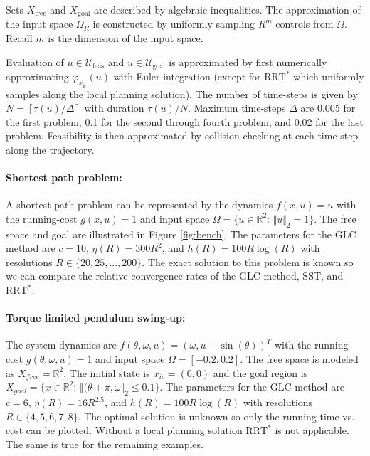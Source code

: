 \documentclass{llncs}
\newcommand{\GLC}{\ensuremath{\mathrm{GLC}}\xspace}
\newcommand{\RRTs}{\ensuremath{\mathrm{RRT}^*}\xspace}
\newcommand{\SST}{\ensuremath{\mathrm{SST}}\xspace}
\begin{document}
Sets $X_\mathrm{free}$ and $X_\mathrm{goal}$ are described by algebraic inequalities.
%
The approximation of the input space $\Omega_{R}$ is constructed by uniformly sampling $R^{m}$ controls from $\Omega$.
%
Recall $m$ is the dimension of the input space. 


Evaluation of $u\in\mathcal{U}_\mathrm{feas}$ and $u\in\mathcal{U}_\mathrm{goal}$ is approximated by first numerically approximating $\varphi_{x_\mathrm{ic}}(u)$ with Euler integration (except for \RRTs which uniformly samples along the local planning solution). 
%
The number of time-steps is given by $N=\left\lceil \tau(u)/\Delta\right\rceil $ with duration $\tau(u)/N$. Maximum time-steps $\Delta$ are 0.005 for the first problem, 0.1 for the second through fourth problem, and 0.02 for the last problem. Feasibility is then approximated by collision checking at each time-step along the trajectory.
%

\paragraph*{Shortest path problem: }

A shortest path problem can be represented by the dynamics $f(x,u)=u$ with the running-cost $g(x,u)=1$ and input space $\Omega=\{u\in\mathbb{R}^{2}:\,\Vert u\Vert_{2}=1\}.$
The free space and goal are illustrated in Figure \ref{fig:bench}.
%
The parameters for the \GLC method are $c=10$, $\eta(R)=300R^2$, and $h(R)=100R\log(R)$ with resolutions $R\in \{20,25,...,200\}$.
%
The exact solution to this problem is known so we can compare the relative convergence rates of the \GLC method, \SST, and \RRTs. 

\paragraph*{Torque limited pendulum swing-up: }

The system dynamics are $f(\theta,\omega,u)=(\omega,u-\sin(\theta))^{T}$
with the running-cost $g(\theta,\omega,u)=1$ and input space  $\Omega=[-0.2,0.2]$.
The free space is modeled as $X_{free}=\mathbb{R}^2$.
%
The initial state is $x_{ic}=(0,0)$ and the goal region is $X_{goal}=\{x\in \mathbb{R}^2:\,\Vert(\theta \pm \pi,\omega \Vert_2 \leq 0.1\}$. 
%
The parameters for the \GLC method are $c=6$, $\eta(R)=16R^{2.5}$, and $h(R)=100R\log(R)$ with resolutions $R\in \{4,5,6,7,8\}$.
%
The optimal solution is unknown so only the running time vs. cost can be plotted. 
%
Without a local planning solution \RRTs is not applicable. 
%
The same is true for the remaining examples.
\end{document}
